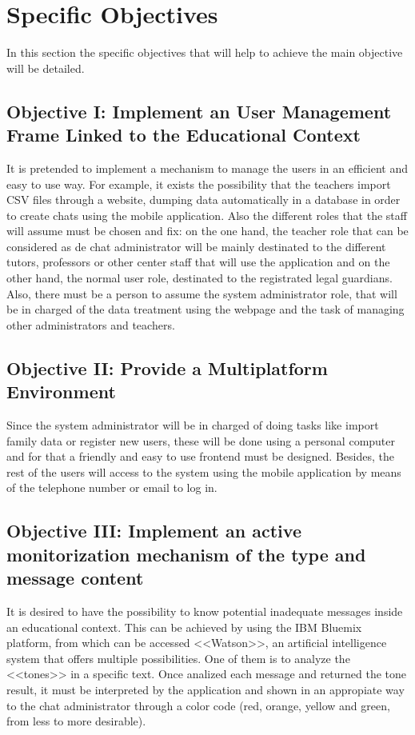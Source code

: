 \section{Specific Objectives}
In this section the specific objectives that will help to achieve the main objective will be detailed.

\clearpage

\subsection{Objective I: Implement an User Management Frame Linked to the Educational Context}
It is pretended to implement a mechanism to manage the users in an efficient and easy to use way. For example, it exists the possibility that the teachers import CSV files through a website, dumping data automatically in a database in order to create chats using the mobile application. Also the different roles that the staff will assume must be chosen and fix: on the one hand, the teacher role that can be considered as de chat administrator will be mainly destinated to the different tutors, professors or other center staff that will use the application and on the other hand, the normal user role, destinated to the registrated legal guardians. Also, there must be a person to assume the system administrator role, that will be in charged of the data treatment using the webpage and the task of managing other administrators and teachers.

\subsection{Objective II: Provide a Multiplatform Environment}
Since the system administrator will be in charged of doing tasks like import family data or register new users, these will be done using a personal computer and for that a friendly and easy to use frontend must be designed. Besides, the rest of the users will access to the system using the mobile application by means of the telephone number or email to log in.

\subsection{Objective III: Implement an active monitorization mechanism of the type and message content}
It is desired to have the possibility to know potential inadequate messages inside an \mbox{educational} context. This can be achieved by using the IBM Bluemix platform, from which can be accessed <<Watson>>, an artificial intelligence system that offers multiple possibilities. One of them is to analyze the <<tones>> in a specific text. Once analized each message and returned the tone result, it must be interpreted by the application and shown in an appropiate way to the chat administrator through a color code (red, orange, yellow and green, from less to more desirable).


